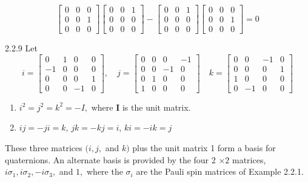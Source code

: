 $$\begin{bmatrix}{0} & {0} & {0} \\ {0} & {0} & {1} \\ {0} & {0} & {0}\end{bmatrix}\begin{bmatrix}{0} & {0} & {1} \\ {0} & {0} & {0} \\ {0} & {0} & {0}\end{bmatrix}- \begin{bmatrix}{0} & {0} & {1} \\ {0} & {0} & {0} \\ {0} & {0} & {0}\end{bmatrix}\begin{bmatrix}{0} & {0} & {0} \\ {0} & {0} & {1} \\ {0} & {0} & {0}\end{bmatrix} = 0 $$


\newpage

\begin{mybox}{2.2.9}
Let
$$
i=\begin{bmatrix}{0} & {1} & {0} & {0} \\ {-1} & {0} & {0} & {0} \\ {0} & {0} & {0} & {1} \\ {0} & {0} & {-1} & {0}\end{bmatrix}, \quad j=\begin{bmatrix}{0} & {0} & {0} & {-1} \\ {0} & {0} & {-1} & {0} \\ {0} & {1} & {0} & {0} \\ {1} & {0} & {0} & {0}\end{bmatrix} \quad k=\begin{bmatrix}{0} & {0} & {-1} & {0} \\ {0} & {0} & {0} & {1} \\ {1} & {0} & {0} & {0} \\ {0} & {-1} & {0} & {0}\end{bmatrix}
$$

\begin{enumerate}[$(a)$]
\item $i^{2}=j^{2}=k^{2}=-I,$ where $\mathbf{I}$ is the unit matrix. 
\item $ij=-ji=k$, $jk=-k j=i$, $ki=-ik=j$
\end{enumerate}

These three matrices $(i, j,$ and $k)$ plus the unit matrix 1 form a basis for quaternions. An alternate basis is provided by the four 2 $\times 2$ matrices, $i \sigma_{1}, i \sigma_{2},-i \sigma_{3},$ and $1,$ where the $\sigma_{i}$ are the Pauli spin matrices of Example 2.2.1.
\end{mybox}


